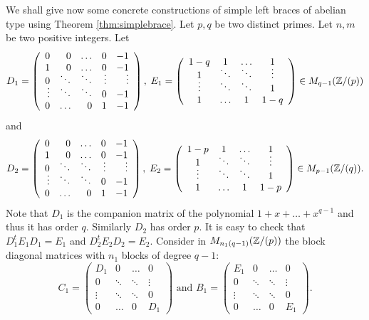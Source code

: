 We shall give now some concrete constructions of simple left braces of abelian type using Theorem \ref{thm:simplebrace}. Let $p,q$ be two distinct primes. Let $n,m$ be two positive integers. Let
$$D_1=\left(\begin{array}{rrrrr}
0&0&\ldots &0&-1\\
\vspace{-5pt}1&0&\ldots &0&-1\\
\vspace{-5pt}0&\ddots &\ddots &\vdots&\vdots\\
\vdots &\ddots &\ddots &0&-1\\
0&\ldots&0&1&-1\end{array}\right),\; E_1=\left(\begin{array}{cccc}
\vspace{-5pt}1-q&1&\ldots &1\\
\vspace{-5pt}1&\ddots &\ddots&\vdots\\
\vdots &\ddots &\ddots &1\\
1&\ldots&1&1-q\end{array}\right)\in M_{q-1}(\Z/(p))$$
 and  
 $$D_2=\left(\begin{array}{rrrrr}
0&0&\ldots&0&-1\\
\vspace{-5pt}1&0&\ldots&0&-1\\
\vspace{-5pt}0&\ddots&\ddots&\vdots&\vdots\\
\vdots&\ddots&\ddots&0&-1\\
0&\ldots&0&1&-1\end{array}\right),\; E_2=\left(\begin{array}{cccc}
\vspace{-5pt}1-p&1&\ldots &1\\
\vspace{-5pt}1&\ddots &\ddots&\vdots\\
\vdots &\ddots &\ddots &1\\
1&\ldots&1&1-p\end{array}\right)\in M_{p-1}(\Z/(q)).$$ 
Note that $D_1$ is the companion matrix of the polynomial $1+x+\dots +x^{q-1}$ and thus it has order $q$. Similarly $D_2$ has order $p$. 
It is easy to check that $D_1^tE_1D_1=E_1$ and $D_2^tE_2D_2=E_2$. Consider in $M_{n_1(q-1)}(\mathbb{Z}/(p))$ the block diagonal matrices with $n_1$ blocks of degree $q-1$:
$$C_1=\left(\begin{array}{cccc}
	D_1&0&\ldots &0\\
	0&\ddots &\ddots&\vdots\\
	\vdots &\ddots &\ddots &0\\
	0&\ldots&0&D_1\end{array}\right)\mbox{ and } B_1=\left(\begin{array}{cccc}
	E_1&0&\ldots &0\\
	0&\ddots &\ddots&\vdots\\
	\vdots &\ddots &\ddots &0\\
	0&\ldots&0&E_1\end{array}\right).$$
